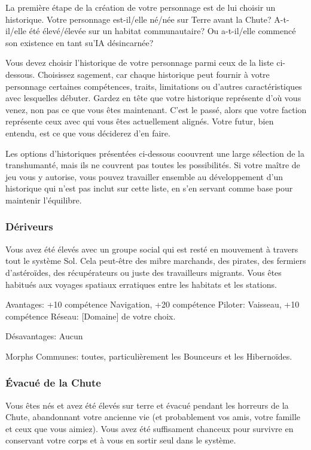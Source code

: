 La première étape de la création de votre personnage est de lui choisir un historique. Votre personnage est-il/elle né/née sur Terre avant la Chute? A-t-il/elle été élevé/élevée sur un habitat communautaire? Ou a-t-il/elle commencé son existence en tant su'IA désincarnée? 

Vous devez choisir l'historique de votre personnage parmi ceux de la liste ci-dessous. Choisissez sagement, car chaque historique peut fournir à votre personnage certaines compétences, traits, limitations ou d'autres caractéristiques avec lesquelles débuter. Gardez en tête que votre historique représente d'où vous venez, non pas ce que vous êtes maintenant. C'est le passé, alors que votre faction représente ceux avec qui vous êtes actuellement alignés. Votre futur, bien entendu, est ce que vous déciderez d'en faire. 

Les options d'historiques présentées ci-dessous coouvrent une large sélection de la transhumanté, mais ils ne couvrent pas toutes les possibilités. Si votre maître de jeu vous y autorise, vous pouvez travailler ensemble au développement d'un historique qui n'est pas inclut sur cette liste, en s'en servant comme base pour maintenir l'équilibre. 

\subsubsection{Dériveurs} \label{sec:drifters} 

Vous avez été élevés avec un groupe social qui est resté en mouvement à travers tout le système Sol. Cela peut-être des mibre marchands, des pirates, des fermiers d'astéroïdes, des récupérateurs ou juste des travailleurs migrants. Vous êtes habitués aux voyages spatiaux erratiques entre les habitats et les stations. 

Avantages: +10 compétence Navigation, +20 compétence Piloter: Vaisseau, +10 compétence Réseau: [Domaine] de votre choix. 

Désavantages: Aucun 

Morphs Communes: toutes, particulièrement les Bounceurs et les Hibernoïdes. 

\subsubsection{Évacué de la Chute} \label{sec:fall-evacuee} 

Vous êtes nés et avez été élevés sur terre et évacué pendant les horreurs de la Chute, abandonnant votre ancienne vie (et probablement vos amis, votre famille et ceux que vous aimiez). Vous avez été suffisament chanceux pour survivre en conservant votre corps et à vous en sortir seul dans le système. 

